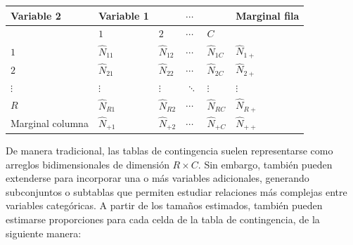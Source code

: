 \documentclass[
  spanish,
  12pt,
]{book}
\begin{document}
\begin{longtable}[]{@{}
  >{\raggedright\arraybackslash}p{}
  >{\raggedright\arraybackslash}p{}
  >{\raggedright\arraybackslash}p{}
  >{\raggedright\arraybackslash}p{}
  >{\raggedright\arraybackslash}p{}
  >{\raggedright\arraybackslash}p{}@{}}
\toprule\noalign{}
\begin{minipage}[b]{\linewidth}\raggedright
Variable 2
\end{minipage} & \begin{minipage}[b]{\linewidth}\raggedright
Variable 1
\end{minipage} & \begin{minipage}[b]{\linewidth}\raggedright
\end{minipage} & \begin{minipage}[b]{\linewidth}\raggedright
\(\cdots\)
\end{minipage} & \begin{minipage}[b]{\linewidth}\raggedright
\end{minipage} & \begin{minipage}[b]{\linewidth}\raggedright
Marginal fila
\end{minipage} \\
\midrule\noalign{}
\endhead
\bottomrule\noalign{}
\endlastfoot
& \(1\) & \(2\) & \(\cdots\) & \(C\) & \\
\(1\) & \(\hat{N}_{11}\) & \(\hat{N}_{12}\) & \(\cdots\) & \(\hat{N}_{1C}\) & \(\hat{N}_{1+}\) \\
\(2\) & \(\hat{N}_{21}\) & \(\hat{N}_{22}\) & \(\cdots\) & \(\hat{N}_{2C}\) & \(\hat{N}_{2+}\) \\
\(\vdots\) & \(\vdots\) & \(\vdots\) & \(\ddots\) & \(\vdots\) & \(\vdots\) \\
\(R\) & \(\hat{N}_{R1}\) & \(\hat{N}_{R2}\) & \(\cdots\) & \(\hat{N}_{RC}\) & \(\hat{N}_{R+}\) \\
Marginal columna & \(\hat{N}_{+1}\) & \(\hat{N}_{+2}\) & \(\cdots\) & \(\hat{N}_{+C}\) & \(\hat{N}_{++}\) \\
\end{longtable}

De manera tradicional, las tablas de contingencia suelen representarse como arreglos bidimensionales de dimensión \(R \times C\). Sin embargo, también pueden extenderse para incorporar una o más variables adicionales, generando subconjuntos o subtablas que permiten estudiar relaciones más complejas entre variables categóricas. A partir de los tamaños estimados, también pueden estimarse proporciones para cada celda de la tabla de contingencia, de la siguiente manera:
\end{document}

